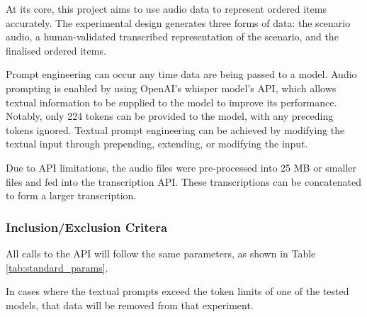 At its core, this project aims to use audio data to represent ordered items accurately. The experimental design generates three forms of data: the scenario audio, a human-validated transcribed representation of the scenario, and the finalised ordered items.

Prompt engineering can occur any time data are being passed to a model. Audio prompting is enabled by using OpenAI's whisper model's API, which allows textual information to be supplied to the model to improve its performance. Notably, only 224 tokens can be provided to the model, with any preceding tokens ignored. Textual prompt engineering can be achieved by modifying the textual input through prepending, extending, or modifying the input.  


Due to API limitations, the audio files were pre-processed into 25 MB or smaller files and fed into the transcription API. These transcriptions can be concatenated to form a larger transcription.

\subsubsection{Inclusion/Exclusion Critera}
All calls to the API will follow the same parameters, as shown in Table \ref{tab:standard_params}.

In cases where the textual prompts exceed the token limits of one of the tested models, that data will be removed from that experiment.

